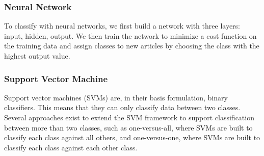 \documentclass[12pt]{article}
\begin{document}
\subsubsection{Neural Network}

To classify with neural networks, we first build a network with three
layers: input, hidden, output. We then train the network to minimize a cost function on the training data and assign classes to new articles by choosing the class with the highest output value.

\subsubsection{Support Vector Machine}

Support vector machines (SVMs) are, in their basis formulation, binary classifiers. This means that they can only classify data between two classes. Several approaches exist to extend the SVM framework to support classification between more than two classes, such as one-versus-all, where SVMs are built to classify each class against all others, and one-versus-one, where SVMs are built to classify each class against each other class.
\end{document}

